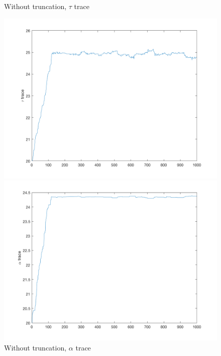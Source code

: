 \documentclass{siamart1116}
\begin{document}
\begin{figure}[!htb]
    \begin{minipage}{0.48\textwidth}
        \centering
        \caption{\label{fig:moon_untruncated_tau} Without truncation, $\tau$ trace}
        \includegraphics[width=\linewidth]{graphics/moons/centered_untruncated/trace_tau.png}
    \end{minipage} \hfill
    \begin{minipage}{0.48\textwidth}
        \centering
        \caption{\label{fig:moon_untruncated_alpha} Without truncation, $\alpha$ trace}
        \includegraphics[width=\linewidth]{graphics/moons/centered_untruncated/trace_alpha.png}
    \end{minipage}
\end{figure}
\end{document}
